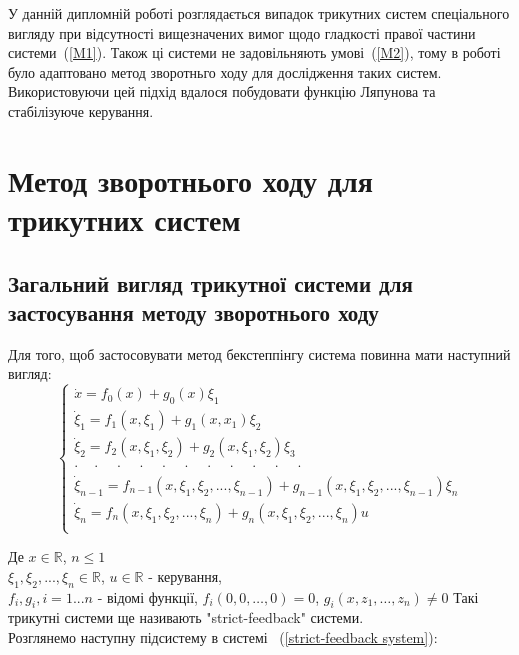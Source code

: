 \documentclass{article}
\begin{document}
У данній дипломній роботі розглядається випадок трикутних систем спеціального вигляду при відсутності вищезначених вимог
щодо гладкості правої  частини системи~(\ref{M1}). 
Також ці системи не задовільняють умові~(\ref{M2}), тому в роботі було адаптовано метод 
зворотньго ходу для дослідження таких систем.  Використовуючи цей підхід вдалося 
побудовати функцію Ляпунова та стабілізуюче керування. 
\pagebreak

\section{Метод зворотнього ходу для трикутних систем}
\subsection{Загальний вигляд трикутної системи для застосування методу зворотнього ходу}
Для того, щоб застосовувати метод бекстеппінгу система повинна мати наступний вигляд:
\begin{equation} \label{strict-feedback system}
    \begin{cases}
        \dot x           = f_0(x)+g_0(x)\xi_1\\
        \dot \xi_1       = f_1(x, \xi_1)+g_{1}(x, x_1)\xi_2 \\
        \dot \xi_2       = f_2(x, \xi_1, \xi_2) + g_2(x, \xi_1, \xi_2)\xi_3 \\
       \cdot \quad \cdot \quad \cdot \quad \cdot  \quad \cdot  \quad \cdot
        \quad \cdot  \quad \cdot  \quad \cdot  \quad \cdot  \quad \cdot\\

       \dot \xi_{n-1}   = f_{n-1}(x, \xi_1, \xi_2, ... ,\xi_{n-1}) 
        +g_{n-1}(x, \xi_1, \xi_2, ... ,\xi_{n-1}) \xi_n\\
        \dot \xi_{n}     = f_{n}(x, \xi_1, \xi_2, ... ,\xi_{n}) 
        +g_{n}(x, \xi_1, \xi_2, ... ,\xi_{n})u\\

	\end{cases}
\end{equation}


Де $x \in \mathbb{R}$, $n \leq 1$\\
$\xi_1, \xi_2, ... ,\xi_n \in \mathbb{R}$, $u \in \mathbb{R}$ - керування,\\ 
$f_i, g_i, i = 1 ... n $ -  відомі функції, $f_i(0,0, \dots, 0) = 0$, 
$g_i(x,z_1, \dots, z_n) \neq 0$
Такі трикутні системи ще називають "strict-feedback" системи.\\
Розглянемо наступну підсистему в системі ~(\ref{strict-feedback system}):
\end{document}
